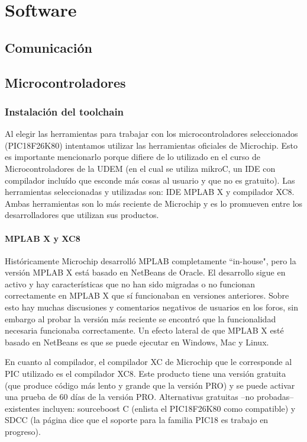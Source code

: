 \chapter{Software}

\section{Comunicación}
\section{Microcontroladores}
 \subsection{Instalación del toolchain}
Al elegir las herramientas para trabajar con los microcontroladores seleccionados (PIC18F26K80) intentamos utilizar las herramientas oficiales de Microchip. Esto es importante mencionarlo porque difiere de lo utilizado en el curso de Microcontroladores de la UDEM (en el cual se utiliza mikroC, un IDE con compilador incluído que esconde más cosas al usuario y que no es gratuito). Las herramientas seleccionadas y utilizadas son: IDE MPLAB X y compilador XC8. Ambas herramientas son lo más reciente de Microchip y es lo promueven entre los desarrolladores que utilizan sus productos.

\subsubsection{MPLAB X y XC8}
Históricamente Microchip desarrolló MPLAB completamente ``in-house", pero la versión MPLAB X está basado en NetBeans de Oracle. El desarrollo sigue en activo y hay características que no han sido migradas o no funcionan correctamente en MPLAB X que sí funcionaban en versiones anteriores. Sobre esto hay muchas discusiones y comentarios negativos de usuarios en los foros, sin embargo al probar la versión más reciente se encontró que la funcionalidad necesaria funcionaba correctamente. Un efecto lateral de que MPLAB X esté basado en NetBeans es que se puede ejecutar en Windows, Mac y Linux.

En cuanto al compilador, el compilador XC de Microchip que le corresponde al PIC utilizado es el compilador XC8. Este producto tiene una versión gratuita (que produce código más lento y grande que la versión PRO) y se puede activar una prueba de 60 días de la versión PRO. Alternativas gratuitas --no probadas-- existentes incluyen: sourceboost C (enlista el PIC18F26K80 como compatible) y SDCC (la página dice que el soporte para la familia PIC18 es trabajo en progreso).

